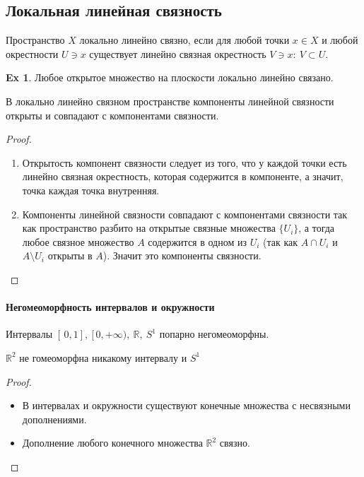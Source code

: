\documentclass[11pt]{book}
\newcommand{\R}{\mathbb{R}}
\theoremstyle{definition}
\theoremstyle{plain}
\theoremstyle{plain}
\theoremstyle{definition}
\newtheorem*{ex}{Ex}
\theoremstyle{remark}
\begin{document}
\subsection{Локальная линейная связность}
\begin{defn}
    Пространство $ X$  {\sf локально линейно связно}, если для любой точки  $ x \in  X$ и любой окрестности $ U \ni x$ существует линейно связная окрестность  $ V \ni x: ~ V \subset U$.
\end{defn}
\begin{ex}
    Любое открытое множество на плоскости локально линейно связано.
\end{ex}
\begin{thm}
    В локально линейно связном пространстве компоненты линейной связности открыты и совпадают с компонентами связности.
\end{thm}
\begin{proof}
    \begin{enumerate}
	\item Открытость компонент связности следует из того, что у каждой точки есть линейно связная окрестность, которая содержится в компоненте, а значит, точка каждая точка внутренняя.
	\item Компоненты линейной связности совпадают с компонентами связности так как пространство разбито на открытые связные множества $ \{U_i\}$, а тогда любое связное множество $ A$ содержится в одном из $ U_i$ (так как $ A \cap U_i$ и $ A \setminus U_i$ открыты в $ A$). Значит это компоненты связности.
    \end{enumerate}
\end{proof}
\paragraph{Негомеоморфность интервалов и окружности}
\begin{thm}
    Интервалы $ [\,0, 1], ~[\,0, +\infty),~ \R, ~S^{1} $ попарно негомеоморфны.
\end{thm}
\begin{thm}
    $ \R^2$ не гомеоморфна никакому интервалу и $ S^{1}$
\end{thm}
\begin{proof}
    $ $
    \begin{itemize}
	\item В интервалах и окружности существуют конечные множества с несвязными дополнениями.
	\item Дополнение любого конечного множества $ \R^2$ связно.
    \end{itemize}
\end{proof}
\end{document}
